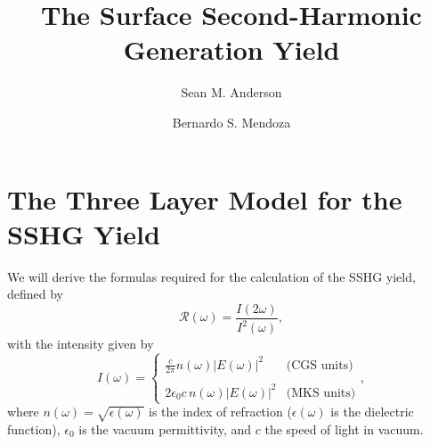 \documentclass[aps,pra,10pt,amsmath,notitlepage,letterpaper]{revtex4-1}
\begin{document}
\title{The Surface Second-Harmonic Generation Yield}
    \author{Sean M. Anderson}


    \author{Bernardo S. Mendoza}

\maketitle
\tableofcontents



\section{The Three Layer Model for the SSHG Yield}\label{sec:3layersshg}

We will derive the formulas required for the calculation of the SSHG yield,
defined by
\begin{equation}\label{eq:rintensities}
\mathcal{R}(\omega)=\frac{I(2\omega)}{I^2(\omega)},
\end{equation}
with the intensity given by \cite{boyd, sutherland}
\begin{equation}\label{eq:intensity}
I(\omega)=
\left\{
\begin{array}{cc}
\frac{c}{2\pi}n(\omega)|E(\omega)|^{2} & \text{(CGS units)} \\\\
2\epsilon_{0}c\, n(\omega)|E(\omega)|^{2} & \text{(MKS units)}
\end{array}
\right.,
\end{equation}
where $n(\omega)=\sqrt{\epsilon(\omega)}$ is the index of refraction
($\epsilon(\omega)$ is the dielectric function), $\epsilon_{0}$ is the vacuum
permittivity, and $c$ the speed of light in vacuum.
\end{document}
